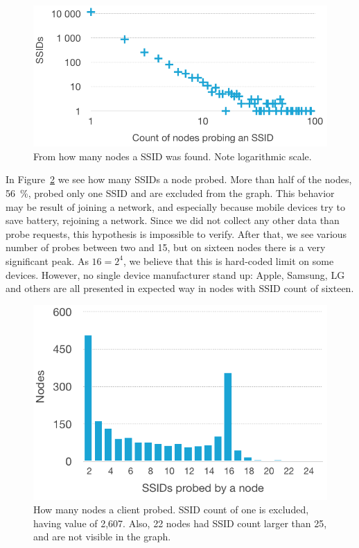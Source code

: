 \documentclass[12pt,a4paper,oneside,pdftex]{report}
\begin{document}
\begin{figure}
    \center
    \includegraphics{images/nodes_per_ssid}
    \caption{From how many nodes a SSID was found. Note logarithmic scale.}
    \label{fig:nodes_per_ssid}
\end{figure}

In Figure~\ref{fig:ssids_per_node} we see how many SSIDs a node probed. More than half of the nodes, 56~\%, probed only one SSID and are excluded from the graph. This behavior may be result of joining a network, and especially because mobile devices try to save battery, rejoining a network. Since we did not collect any other data than probe requests, this hypothesis is impossible to verify. After that, we see various number of probes between two and 15, but on sixteen nodes there is a very significant peak. As $16 = 2^4$, we believe that this is hard-coded limit on some devices. However, no single device manufacturer stand up: Apple, Samsung, LG and others are all presented in expected way in nodes with SSID count of sixteen.

\begin{figure}
    \center
    \includegraphics{images/ssids_per_node}
    \caption{How many nodes a client probed. SSID count of one is excluded, having value of 2,607. Also, 22 nodes had SSID count larger than 25, and are not visible in the graph.}
    \label{fig:ssids_per_node}
\end{figure}
\end{document}
